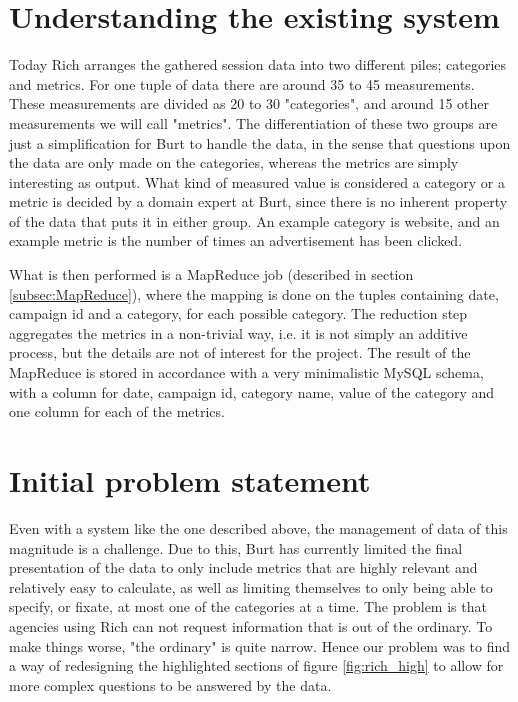 \section{Understanding the existing system} \label{sec:Understanding the existing system}
Today Rich arranges the gathered session data into two different piles; categories and metrics. For one tuple of data there are around 35 to 45 measurements. These measurements are divided as 20 to 30 "categories", and around 15 other measurements we will call "metrics". The differentiation of these two groups are just a simplification for Burt to handle the data, in the sense that questions upon the data are only made on the categories, whereas the metrics are simply interesting as output. What kind of measured value is considered a category or a metric is decided by a domain expert at Burt, since there is no inherent property of the data that puts it in either group. An example category is website, and an example metric is the number of times an advertisement has been clicked.

What is then performed is a MapReduce job (described in section \ref{subsec:MapReduce}), where the mapping is done on the tuples containing date, campaign id and a category, for each possible category. The reduction step aggregates the metrics in a non-trivial way, i.e. it is not simply an additive process, but the details are not of interest for the project. The result of the MapReduce is stored in accordance with a very minimalistic MySQL schema, with a column for date, campaign id, category name, value of the category and one column for each of the metrics.

\section{Initial problem statement} \label{sec:Initial problem statement}
Even with a system like the one described above, the management of data of this magnitude is a challenge. Due to this, Burt has currently limited the final presentation of the data to only include metrics that are highly relevant and relatively easy to calculate, as well as limiting themselves to only being able to specify, or fixate, at most one of the categories at a time. The problem is that agencies using Rich can not request information that is out of the ordinary. To make things worse, "the ordinary" is quite narrow. Hence our problem was to find a way of redesigning the highlighted sections of figure \ref{fig:rich_high} to allow for more complex questions to be answered by the data.

